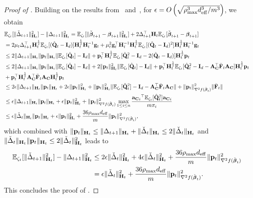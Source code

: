 \documentclass[11pt,a4paper]{article}
\begin{document}
\begin{proof}[Proof of ]
Building on the results from~ and~, for $\epsilon=O\left(\sqrt{\rho_{\max}^3 d^3_{\mathrm{eff}}/m^3}\right)$,   we obtain 
    \begin{align}
       &{\mathbb{E}}_{\zeta_t}[\|\check{\Delta}_{t+1}\|^2_{\mathbf{H}_t}] -\|\Delta_{t+1}\|^2_{\mathbf{H}_t}
       ={\mathbb{E}}_{\zeta_t}[\|\check{\boldsymbol{\beta}}_{t+1}-\boldsymbol{\beta}_{t+1}\|^2_{\mathbf{H}_t}]+2\Delta_{t+1}^\top\mathbf{H}_t{\mathbb{E}}_{\zeta_t}[\check{\boldsymbol{\beta}}_{t+1}-\boldsymbol{\beta}_{t+1}]\nonumber\\
        &=2\mu_{t}\Delta_{t+1}^\top\mathbf{H}^{\frac{1}{2}}_t{\mathbb{E}}_{\zeta_t}[(\hat {\mathbf{Q}}_t-\mathbf{I}_d)]\mathbf{H}^{\frac{1}{2}}_t\mathbf{H}_t^{-1}\mathbf{g}_t+\mu^2_{t}\mathbf{g}^\top_t\mathbf{H}^{-1}_t\mathbf{H}^{\frac{1}{2}}_t{\mathbb{E}}_{\zeta_t}[(\hat {\mathbf{Q}}_t-\mathbf{I}_d)^2]\mathbf{H}^{\frac{1}{2}}_t\mathbf{H}_t^{-1}\mathbf{g}_t\nonumber\\
    &\leq 2\|\Delta_{t+1}\|_{\mathbf{H}_t}\|\mathbf{p}_t\|_{\mathbf{H}_t}\|{\mathbb{E}}_{\zeta_t}[\hat {\mathbf{Q}}_t]-\mathbf{I}_d\|+\mathbf{p}^\top_t\mathbf{H}^{\frac{1}{2}}_t{\mathbb{E}}_{\zeta_t}[\hat {\mathbf{Q}}_t^2-\mathbf{I}_d-2(\hat {\mathbf{Q}}_t-\mathbf{I}_d)]\mathbf{H}^{\frac{1}{2}}_t\mathbf{p}_t\nonumber\\ 
    &\leq2\|\Delta_{t+1}\|_{\mathbf{H}_t}\|\mathbf{p}_t\|_{\mathbf{H}_t}\|{\mathbb{E}}_{\zeta_t}[\hat {\mathbf{Q}}_t]-\mathbf{I}_d\|+2\|\mathbf{p}_t\|^2_{\mathbf{H}_t}\|{\mathbb{E}}_{\zeta_t}[\hat {\mathbf{Q}}_t]-\mathbf{I}_d\| +\mathbf{p}^\top_t\mathbf{H}^{\frac{1}{2}}_t{\mathbb{E}}_{\zeta_t}[\hat {\mathbf{Q}}_t^2-\mathbf{I}_d-\mathbf{A}_{\mathbf{C}}^\top\bar{\mathbf{F}}_t\mathbf{A}_{\mathbf{C}}]\mathbf{H}^{\frac{1}{2}}_t\mathbf{p}_t \nonumber \\
    &+\mathbf{p}^\top_t\mathbf{H}^{\frac{1}{2}}_t\mathbf{A}_{\mathbf{C}}^\top\bar{\mathbf{F}}_t\mathbf{A}_{\mathbf{C}}\mathbf{H}^{\frac{1}{2}}_t\mathbf{p}_t
       \nonumber\\
       &\leq 2\epsilon\|\Delta_{t+1}\|_{\mathbf{H}_t}\|\mathbf{p}_t\|_{\mathbf{H}_t} +2\epsilon\|\mathbf{p}_t\|^2_{\mathbf{H}_t}+\|\mathbf{p}_t\|^2_{\mathbf{H}_t}\|{\mathbb{E}}_{\zeta_t}[\hat {\mathbf{Q}}_t^2]-\mathbf{I}_d-\mathbf{A}_{\mathbf{C}}^\top\bar{\mathbf{F}}_t\mathbf{A}_{\mathbf{C}}\| +\|\mathbf{p}_t\|^2_{\nabla^2f(\check{\boldsymbol{\beta}}_{t})}
    \|\bar{\mathbf{F}}_t\|
       \nonumber\\
        &\leq  \epsilon\|\Delta_{t+1}\|_{\mathbf{H}_t}\|\mathbf{p}_t\|_{\mathbf{H}_t} +\epsilon\|\mathbf{p}_t\|^2_{\mathbf{H}_t}+\|\mathbf{p}_t\|^2_{\nabla^2f(\check{\boldsymbol{\beta}}_{t})}\max\limits_{1\leq i\leq n}\frac{{{\mathbf{a}_{\mathbf{C}}}_i}^\top{\mathbb{E}}_{\zeta_t}[\hat {\mathbf{Q}}_t^2]{\mathbf{a}_{\mathbf{C}}}_i}{m\pi_i}
       \nonumber\\
       &\leq  \epsilon\|\check{\Delta}_{t}\|_{\mathbf{H}_t}\|\mathbf{p}_t\|_{\mathbf{H}_t} +\epsilon\|\mathbf{p}_t\|^2_{\mathbf{H}_t}+\frac{36\rho_{\max} d_{\mathrm{eff}}}{m}\|\mathbf{p}_t\|^2_{\nabla^2f(\check{\boldsymbol{\beta}}_{t})},
       \nonumber
    \end{align}
    which combined with $\|\mathbf{p}_t\|_{\mathbf{H}_t}\leq\|\Delta_{t+1}\|_{\mathbf{H}_t}+\|\check{\Delta}_{t}\|_{\mathbf{H}_t}\leq2\|\check{\Delta}_{t}\|_{\mathbf{H}_t}$ and $\|\check{\Delta}_{t}\|_{\mathbf{H}_t}\|\mathbf{p}_t\|_{\mathbf{H}_t}\leq 2\|\check{\Delta}_{t}\|^2_{\mathbf{H}_t}$ leads to
    \begin{align}
     {\mathbb{E}}_{\zeta_t}[\|\check{\Delta}_{t+1}\|^2_{\mathbf{H}_t}] -\|\Delta_{t+1}\|^2_{\mathbf{H}_t}   &\leq2 \epsilon\|\check{\Delta}_{t}\|^2_{\mathbf{H}_t} +4 \epsilon\|\check{\Delta}_{t}\|^2_{\mathbf{H}_t}+\frac{36\rho_{\max} d_{\mathrm{eff}}}{m}\|\mathbf{p}_t\|^2_{\nabla^2f(\check{\boldsymbol{\beta}}_{t})}\nonumber\\
     &=\epsilon\|\check{\Delta}_{t}\|^2_{\mathbf{H}_t} +\frac{36\rho_{\max} d_{\mathrm{eff}}}{m}\|\mathbf{p}_t\|^2_{\nabla^2f(\check{\boldsymbol{\beta}}_{t})}.\nonumber
    \end{align}
   This concludes the proof of .
\end{proof}
\end{document}
